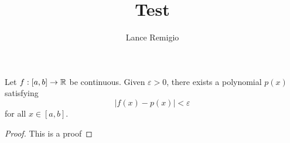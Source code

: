 \documentclass[a4paper]{report}
\title{Test}
\author{Lance Remigio}
\begin{document}
\maketitle

\begin{theorem}
    Let \( f : [a,b] \to \mathbb{R}  \) be continuous. Given \( \varepsilon > 0  \), there exists a polynomial \( p(x) \) satisfying 
    \[  | f(x) - p(x) | < \varepsilon \] for all \( x \in [a,b] \).
\end{theorem}
\begin{proof}
This is a proof
\end{proof}
\end{document}
